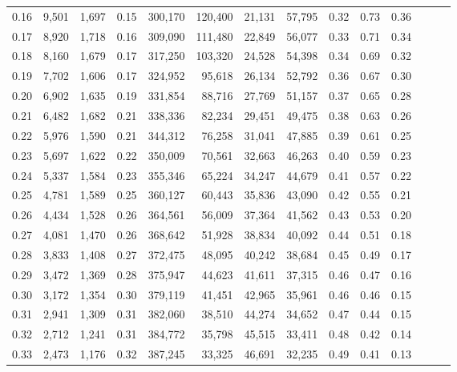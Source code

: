 \begin{tabular}{rrrrrrrrrrrrrr}
0.16 &   9,501 &  1,697 &  0.15 &  300,170 &  120,400 &  21,131 &  57,795 &  0.32 &  0.73 &      0.36 \\
0.17 &   8,920 &  1,718 &  0.16 &  309,090 &  111,480 &  22,849 &  56,077 &  0.33 &  0.71 &      0.34 \\
0.18 &   8,160 &  1,679 &  0.17 &  317,250 &  103,320 &  24,528 &  54,398 &  0.34 &  0.69 &      0.32 \\
0.19 &   7,702 &  1,606 &  0.17 &  324,952 &   95,618 &  26,134 &  52,792 &  0.36 &  0.67 &      0.30 \\
0.20 &   6,902 &  1,635 &  0.19 &  331,854 &   88,716 &  27,769 &  51,157 &  0.37 &  0.65 &      0.28 \\
0.21 &   6,482 &  1,682 &  0.21 &  338,336 &   82,234 &  29,451 &  49,475 &  0.38 &  0.63 &      0.26 \\
0.22 &   5,976 &  1,590 &  0.21 &  344,312 &   76,258 &  31,041 &  47,885 &  0.39 &  0.61 &      0.25 \\
0.23 &   5,697 &  1,622 &  0.22 &  350,009 &   70,561 &  32,663 &  46,263 &  0.40 &  0.59 &      0.23 \\
0.24 &   5,337 &  1,584 &  0.23 &  355,346 &   65,224 &  34,247 &  44,679 &  0.41 &  0.57 &      0.22 \\
0.25 &   4,781 &  1,589 &  0.25 &  360,127 &   60,443 &  35,836 &  43,090 &  0.42 &  0.55 &      0.21 \\
0.26 &   4,434 &  1,528 &  0.26 &  364,561 &   56,009 &  37,364 &  41,562 &  0.43 &  0.53 &      0.20 \\
0.27 &   4,081 &  1,470 &  0.26 &  368,642 &   51,928 &  38,834 &  40,092 &  0.44 &  0.51 &      0.18 \\
0.28 &   3,833 &  1,408 &  0.27 &  372,475 &   48,095 &  40,242 &  38,684 &  0.45 &  0.49 &      0.17 \\
0.29 &   3,472 &  1,369 &  0.28 &  375,947 &   44,623 &  41,611 &  37,315 &  0.46 &  0.47 &      0.16 \\
0.30 &   3,172 &  1,354 &  0.30 &  379,119 &   41,451 &  42,965 &  35,961 &  0.46 &  0.46 &      0.15 \\
0.31 &   2,941 &  1,309 &  0.31 &  382,060 &   38,510 &  44,274 &  34,652 &  0.47 &  0.44 &      0.15 \\
0.32 &   2,712 &  1,241 &  0.31 &  384,772 &   35,798 &  45,515 &  33,411 &  0.48 &  0.42 &      0.14 \\
0.33 &   2,473 &  1,176 &  0.32 &  387,245 &   33,325 &  46,691 &  32,235 &  0.49 &  0.41 &      0.13 \\

\end{tabular}
